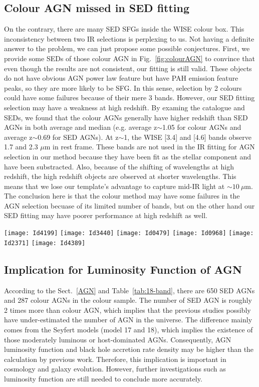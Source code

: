 \documentclass[a4paper,fleqn,usenatbib]{mnras}
\begin{document}
\subsection{Colour AGN missed in SED fitting}
On the contrary, there are many SED SFGs inside the WISE colour box. This inconsistency between two IR selections is perplexing to us. Not having a definite answer to the problem, we can just propose some possible conjectures. First, we provide some SEDs of those colour AGN in Fig.~\ref{fig:colourAGN} to convince that even though the results are not consistent, our fitting is still valid. These objects do not have obvious AGN power law feature but have PAH emission feature peaks, so they are more likely to be SFG. In this sense, selection by 2 colours could have some failures because of their mere 3 bands. However, our SED fitting selection may have a weakness at high redshift. By examing the catalogue and SEDs, we found that the colour AGNs generally have higher redshift than SED AGNs in both average and median (e.g. average z$\sim$1.05 for colour AGNs and average z$\sim$0.69 for SED AGNs). At z$\sim$1, the  WISE [3.4] and [4.6] bands observe 1.7 and 2.3 $\mu$m in rest frame. These bands are not used in the IR fitting for AGN selection in our method because they have been fit as the stellar component and have been substracted. Also, because of the shifting of wavelengths at high redshift, the high redshift objects are observed at shorter wavelengths. This means that we lose our template's advantage to capture mid-IR light at $\sim10~\mu$m. The conclusion here is that the colour method may have some failures in the AGN selection becuase of its limited number of bands, but on the other hand our SED fitting may have poorer performance at high redshift as well.      

\begin{figure*}
	\texttt{[image: Id4199]}
	\texttt{[image: Id3440]}
	\texttt{[image: Id0479]}
	\texttt{[image: Id0968]}
	\texttt{[image: Id2371]}
	\texttt{[image: Id4389]}
    \caption{Example SEDs of colour AGNs that are fit to be SFG in SED fitting.}
    \label{fig:colourAGN}
\end{figure*}

\subsection{Implication for Luminosity Function of AGN}
According to the Sect.~\ref{AGN} and Table~\ref{tab:18-band},  there are 650 SED AGNs and 287 colour AGNs in the colour sample. The number of SED AGN is roughly 2 times more than colour AGN, which implies that the previous studies possibly have under-estimated the number of AGN in the universe. The difference mainly comes from the Seyfert models (model 17 and 18), which implies the existence of those moderately luminous or host-dominated AGNs. Consequently, AGN luminosity function and black hole accretion rate density may be higher than the calculation by previous work. Therefore, this implication is important in cosmology and galaxy evolution.  However, further investigations such as luminosity function are still needed to conclude more accurately.   
\end{document}
